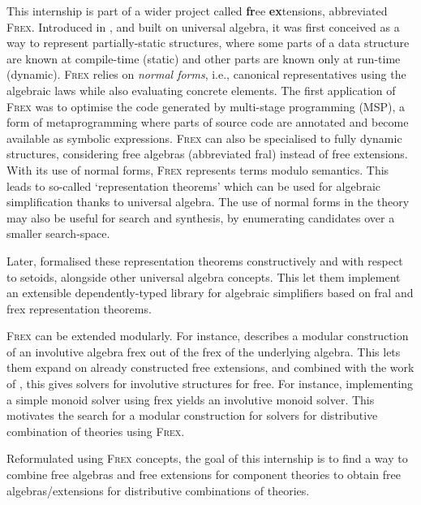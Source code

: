 This internship is part of a wider project called \textbf{fr}ee \textbf{ex}tensions, abbreviated \textsc{Frex}. Introduced in \textcite{frex_origin}, and built on universal algebra, it was first conceived as a way to represent partially-static structures, where some parts of a data structure are known at compile-time (static) and other parts are known only at run-time (dynamic). \textsc{Frex} relies on \textit{normal forms}, i.e., canonical representatives using the algebraic laws while also evaluating concrete elements. The first application of \textsc{Frex} was to optimise the code generated by multi-stage programming (MSP), a form of metaprogramming where parts of source code are annotated and become available as symbolic expressions. 
\textsc{Frex} can also be specialised to fully dynamic structures, considering free algebras (abbreviated fral) instead of free extensions. With its use of normal forms, \textsc{Frex} represents terms modulo semantics. This leads to so-called `representation theorems' which can be used for algebraic simplification thanks to universal algebra. The use of normal forms in the theory may also be useful for search and synthesis, by enumerating candidates over a smaller search-space.

Later, \textcite{idris_frex} formalised these representation theorems constructively and with respect to setoids, alongside other universal algebra concepts. This let them implement an extensible dependently-typed library for algebraic simplifiers based on fral and frex representation theorems.

\textsc{Frex} can be extended modularly. For instance, \parencite{involutive_frex} describes a modular construction of an involutive algebra frex out of the frex of the underlying algebra. This lets them expand on already constructed free extensions, and combined with the work of \textcite{idris_frex}, this gives solvers for involutive structures for free. For instance, implementing a simple monoid solver using frex yields an involutive monoid solver. This motivates the search for a modular construction for solvers for distributive combination of theories using \textsc{Frex}.

Reformulated using \textsc{Frex} concepts, the goal of this internship is to find a way to combine free algebras and free extensions for component theories to obtain free algebras/extensions for distributive combinations of theories.


